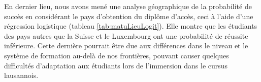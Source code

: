En dernier lieu, nous avons mené une analyse géographique de la probabilité de succès en considérant le pays d'obtention du diplôme d'accès, ceci à l'aide d'une régression logistique (tableau \ref{tab:matuLieuLogit}). Elle montre que les étudiants des pays autres que la Suisse et le Luxembourg ont une probabilité de réussite inférieure. Cette dernière pourrait être due aux différences dans le niveau et le système de formation au-delà de nos frontières, pouvant causer quelques difficultés d'adaptation aux étudiants lors de l'immersion dans le cursus lausannois.

